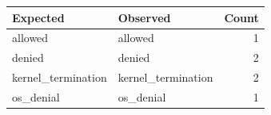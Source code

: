 \begin{tabular}{llr}
Expected & Observed & Count \\
\hline
allowed & allowed & 1 \\
denied & denied & 2 \\
kernel\_termination & kernel\_termination & 2 \\
os\_denial & os\_denial & 1 \\
\end{tabular}

